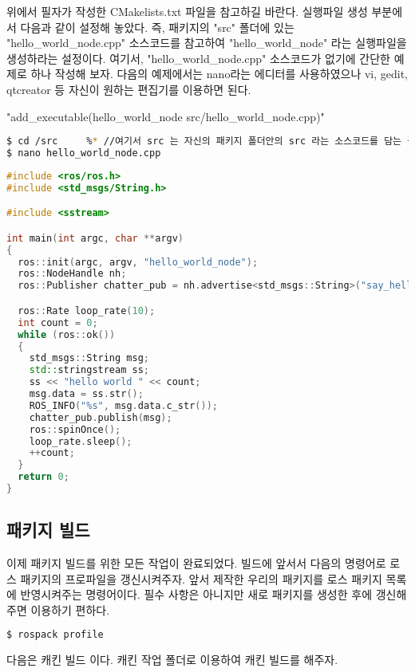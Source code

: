 위에서 필자가 작성한 CMakelists.txt 파일을 참고하길 바란다. 실행파일 생성 부분에서 다음과 같이 설정해 놓았다. 즉, 패키지의 "src" 폴더에 있는 "hello\_world\_node.cpp" 소스코드를 참고하여 "hello\_world\_node" 라는 실행파일을 생성하라는 설정이다. 여기서, "hello\_world\_node.cpp" 소스코드가 없기에 간단한 예제로 하나 작성해 보자. 다음의 예제에서는 nano라는 에디터를 사용하였으나 vi, gedit, qtcreator 등 자신이 원하는 편집기를 이용하면 된다.

\noindent
"add\_executable(hello\_world\_node src/hello\_world\_node.cpp)"

\begin{lstlisting}[language=bash]
$ cd /src     %* //여기서 src 는 자신의 패키지 폴더안의 src 라는 소스코드를 담는 폴더를 말한다.*)
$ nano hello_world_node.cpp
\end{lstlisting}

\begin{lstlisting}[language=C++]
#include <ros/ros.h>
#include <std_msgs/String.h>

#include <sstream>

int main(int argc, char **argv)
{
  ros::init(argc, argv, "hello_world_node");
  ros::NodeHandle nh;
  ros::Publisher chatter_pub = nh.advertise<std_msgs::String>("say_hello_world", 1000);

  ros::Rate loop_rate(10);
  int count = 0;
  while (ros::ok())
  {
    std_msgs::String msg;
    std::stringstream ss;
    ss << "hello world " << count;
    msg.data = ss.str();
    ROS_INFO("%s", msg.data.c_str());
    chatter_pub.publish(msg);
    ros::spinOnce();
    loop_rate.sleep();
    ++count;
  }
  return 0;
}
\end{lstlisting}

\subsection{패키지 빌드}

이제 패키지 빌드를 위한 모든 작업이 완료되었다.  빌드에 앞서서 다음의 명령어로 로스 패키지의 프로파일을 갱신시켜주자. 앞서 제작한 우리의 패키지를 로스 패키지 목록에 반영시켜주는 명령어이다. 필수 사항은 아니지만 새로 패키지를 생성한 후에 갱신해주면 이용하기 편하다.

\begin{lstlisting}[language=bash]
$ rospack profile
\end{lstlisting}

\noindent
다음은 캐킨 빌드 이다. 캐킨 작업 폴더로 이용하여 캐킨 빌드를 해주자.

